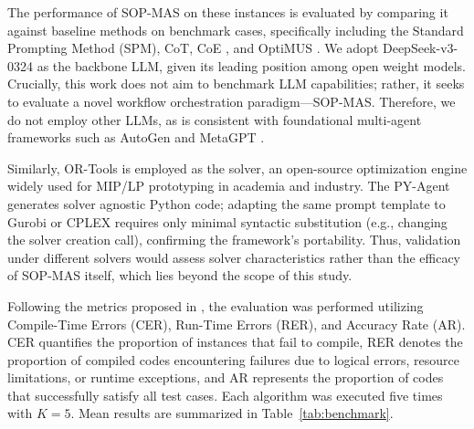 \documentclass[preprint,12pt]{elsarticle}
\begin{document}
The performance of SOP-MAS on these instances is evaluated by comparing it against baseline methods on benchmark cases, specifically including the Standard Prompting Method (SPM), CoT, CoE \cite{xiaoChainofExpertsWhenLLMs2024}, and OptiMUS \cite{ahmaditeshniziOptiMUSScalableOptimization2024}. We adopt DeepSeek-v3-0324 as the backbone LLM, given its leading position among open weight models. Crucially, this work does not aim to benchmark LLM capabilities; rather, it seeks to evaluate a novel workflow orchestration paradigm—SOP-MAS. Therefore, we do not employ other LLMs, as is consistent with foundational multi-agent frameworks such as AutoGen \cite{wuAutoGenEnablingNextGen2023a} and MetaGPT \cite{hongMetaGPTMetaProgramming2024d}.

Similarly, OR-Tools is employed as the solver, an open-source optimization engine widely used for MIP/LP prototyping in academia and industry. The PY-Agent generates solver agnostic Python code; adapting the same prompt template to Gurobi or CPLEX requires only minimal syntactic substitution (e.g., changing the solver creation call), confirming the framework's portability. Thus, validation under different solvers would assess solver characteristics rather than the efficacy of SOP-MAS itself, which lies beyond the scope of this study.

Following the metrics proposed in \cite{xiaoChainofExpertsWhenLLMs2024}, the evaluation was performed utilizing Compile-Time Errors (CER), Run-Time Errors (RER), and Accuracy Rate (AR). CER quantifies the proportion of instances that fail to compile, RER denotes the proportion of compiled codes encountering failures due to logical errors, resource limitations, or runtime exceptions, and AR represents the proportion of codes that successfully satisfy all test cases. Each algorithm was executed five times with $K=5$. Mean results are summarized in Table~\ref{tab:benchmark}.

\end{document}
